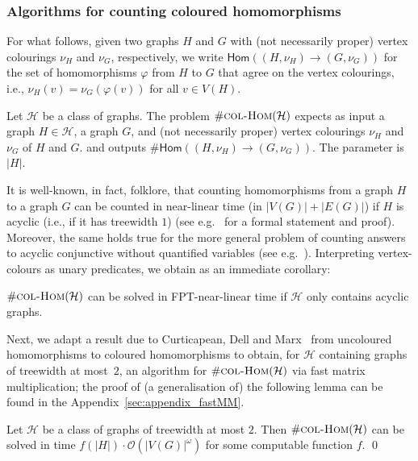 \documentclass[authorcolumns,numberwithinsect]{no-lipics-v2022}
\newcommand{\homs}[2]{\mathsf{Hom}(#1 \to #2)}
\newcommand{\colhomsprob}{\text{\sc{col-Hom}}}
\begin{document}
\subsubsection{Algorithms for counting coloured homomorphisms}\label{sec:algo_count_col_homs}
For what follows, given two graphs $H$ and $G$ with (not necessarily proper) vertex colourings $\nu_H$ and $\nu_G$, respectively, we write $\homs{(H,\nu_H)}{(G,\nu_G)}$ for the set of homomorphisms $\varphi$ from $H$ to $G$ that agree on the vertex colourings, i.e., $\nu_H(v)=\nu_G(\varphi(v))$ for all $v\in V(H)$. 

\begin{definition}[$\#\colhomsprob(\mathcal{H})$]
    Let $\mathcal{H}$ be a class of graphs. The problem $\#\colhomsprob(\mathcal{H})$ expects as input a graph $H\in \mathcal{H}$, a graph $G$, and (not necessarily proper) vertex colourings $\nu_H$ and $\nu_G$ of $H$ and $G$. and outputs $\#\homs{(H,\nu_H)}{(G,\nu_G)}$. The parameter is $|H|$.
\end{definition}

It is well-known, in fact, folklore, that counting homomorphisms from a graph $H$ to a graph $G$ can be counted in near-linear time (in $|V(G)|+ |E(G)|$) if $H$ is acyclic (i.e., if it has treewidth $1$) (see e.g.\ \cite[Theorem 7]{BeraGLSS22} for a formal statement and proof). Moreover, the same holds true for the more general problem of counting answers to acyclic conjunctive without quantified variables (see e.g.\ \cite[Theorem 12]{BraultBaron13}). Interpreting vertex-colours as unary predicates, we obtain as an immediate corollary:

\begin{fact}\label{fact:colhoms_lintime}
    $\#\colhomsprob(\mathcal{H})$ can be solved in FPT-near-linear time if $\mathcal{H}$ only contains acyclic graphs.
\end{fact}

Next, we adapt a result due to Curticapean, Dell and Marx~\cite[Theorem 1.7]{CurticapeanDM17} from uncoloured homomorphisms to coloured homomorphisms to obtain, for $\mathcal{H}$ containing graphs of treewidth at most~$2$, an algorithm for $\#\colhomsprob(\mathcal{H})$ via fast matrix multiplication; the proof of (a generalisation of) the following lemma can be found in the Appendix~\ref{sec:appendix_fastMM}.

\begin{lemma}\label{lem:colhom_matrix_multi}
    Let $\mathcal{H}$ be a class of graphs of treewidth at most $2$. Then $\#\colhomsprob(\mathcal{H})$ can be solved in time $f(|H|)\cdot \mathcal{O}(|V(G)|^{\omega})$ for some computable function $f$. \qed
\end{lemma}
\end{document}
